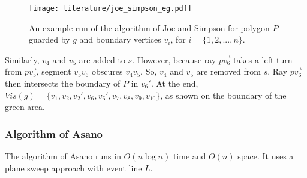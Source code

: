 \newpage
\begin{figure}[h!]
	\centering
	\texttt{[image: literature/joe\_simpson\_eg.pdf]}
	\caption{An example run of the algorithm of Joe and Simpson \cite{joe1987corrections} for polygon $P$ guarded by $g$ and boundary vertices $v_i$, for $i = \{1, 2, ..., n\}$.}
	\label{fig:joe}
\end{figure}

\noindent
Similarly, $v_4$ and $v_5$ are added to $s$. However, because ray $\vec{pv_6}$ takes a left turn from $\vec{pv_5}$, segment $\overline{v_5v_6}$ obscures $\overline{v_4v_5}$. So, $v_4$ and $v_5$ are removed from $s$. Ray $\vec{pv_6}$ then intersects the boundary of $P$ in $v_6'$. At the end, $\mathit{Vis}(g) = \{v_1, v_2, v_2', v_6, v_6', v_7, v_8, v_9, v_{10}\}$, as shown on the boundary of the green area. 




\subsubsection{Algorithm of Asano}
The algorithm of Asano \cite{asano1985efficient} runs in $O(n \log n)$ time and $O(n)$ space. It uses a plane sweep approach with event line $L$. 

